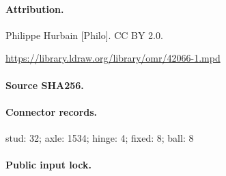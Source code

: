 \paragraph{Attribution.}Philippe Hurbain [Philo]. CC BY 2.0.\par\url{https://library.ldraw.org/library/omr/42066-1.mpd}
\paragraph{Source SHA256.}
\paragraph{Connector records.}stud: 32; axle: 1534; hinge: 4; fixed: 8; ball: 8
\paragraph{Public input lock.}
